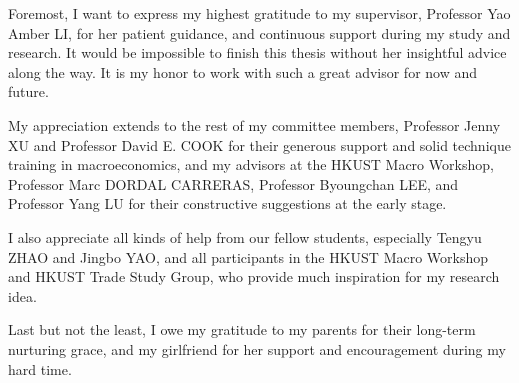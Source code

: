 \acknowledgments

Foremost, I want to express my highest gratitude to my supervisor, Professor Yao Amber LI, for her patient guidance, and continuous support during my study and research. It would be impossible to finish this thesis without her insightful advice along the way. It is my honor to work with such a great advisor for now and future.

My appreciation extends to the rest of my committee members, Professor Jenny XU and Professor David E. COOK for their generous support and solid technique training in macroeconomics, and my advisors at the HKUST Macro Workshop, Professor Marc DORDAL CARRERAS, Professor Byoungchan LEE, and Professor Yang LU for their constructive suggestions at the early stage.

I also appreciate all kinds of help from our fellow students, especially Tengyu ZHAO and Jingbo YAO, and all participants in the HKUST Macro Workshop and HKUST Trade Study Group, who provide much inspiration for my research idea.

Last but not the least, I owe my gratitude to my parents for their long-term nurturing grace, and my girlfriend for her support and encouragement during my hard time.

\endacknowledgments
